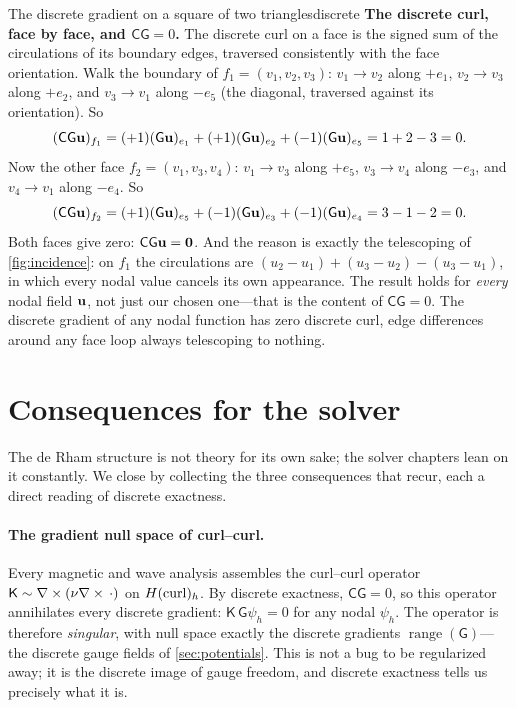 \begin{workedexample}{The discrete gradient on a square of two triangles}{discrete}
\textbf{The discrete curl, face by face, and $\mathsf{C}\mathsf{G}=0$.} The discrete
curl on a face is the signed sum of the circulations of its boundary edges, traversed
consistently with the face orientation. Walk the boundary of $f_1=(v_1,v_2,v_3)$:
$v_1\!\to\!v_2$ along $+e_1$, $v_2\!\to\!v_3$ along $+e_2$, and $v_3\!\to\!v_1$ along
$-e_5$ (the diagonal, traversed against its orientation). So
\[
  (\mathsf{C}\mathsf{G}\mathbf{u})_{f_1}
  = (+1)(\mathsf{G}\mathbf{u})_{e_1} + (+1)(\mathsf{G}\mathbf{u})_{e_2} + (-1)(\mathsf{G}\mathbf{u})_{e_5}
  = 1 + 2 - 3 = 0.
\]
Now the other face $f_2=(v_1,v_3,v_4)$: $v_1\!\to\!v_3$ along $+e_5$, $v_3\!\to\!v_4$
along $-e_3$, and $v_4\!\to\!v_1$ along $-e_4$. So
\[
  (\mathsf{C}\mathsf{G}\mathbf{u})_{f_2}
  = (+1)(\mathsf{G}\mathbf{u})_{e_5} + (-1)(\mathsf{G}\mathbf{u})_{e_3} + (-1)(\mathsf{G}\mathbf{u})_{e_4}
  = 3 - 1 - 2 = 0.
\]
Both faces give zero: $\mathsf{C}\mathsf{G}\mathbf{u}=\mathbf 0$. And the reason is exactly
the telescoping of \cref{fig:incidence}: on $f_1$ the circulations are
$(u_2-u_1)+(u_3-u_2)-(u_3-u_1)$, in which every nodal value cancels its own appearance.
The result holds for \emph{every} nodal field $\mathbf{u}$, not just our chosen one---that
is the content of $\mathsf{C}\mathsf{G}=0$. The discrete gradient of any nodal function
has zero discrete curl, edge differences around any face loop always telescoping to
nothing.
\end{workedexample}

\section{Consequences for the solver}
\label{sec:divfree}

The de Rham structure is not theory for its own sake; the solver chapters lean on it
constantly. We close by collecting the three consequences that recur, each a direct
reading of discrete exactness.

\paragraph{The gradient null space of curl--curl.} Every magnetic and wave analysis
assembles the curl--curl operator $\mathsf{K}\sim\nabla\times(\nu\nabla\times\,\cdot)$ on $H(\mathrm{curl})_h$.
By discrete exactness, $\mathsf{C}\mathsf{G}=0$, so this operator annihilates every
discrete gradient: $\mathsf{K}\,\mathsf{G}\psi_h=0$ for any nodal $\psi_h$. The
operator is therefore \emph{singular}, with null space exactly the discrete gradients
$\operatorname{range}(\mathsf{G})$---the discrete gauge fields of \cref{sec:potentials}.
This is not a bug to be regularized away; it is the discrete image of gauge freedom,
and discrete exactness tells us precisely what it is.

